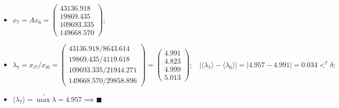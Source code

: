 \begin{itemize}
    \item
    $x_7 = Ax_6 =
    \begin{pmatrix}
        43136.918\\19869.435\\109693.335\\149668.570
    \end{pmatrix};$
    \item
    $\lambda_7 = x_{i7} / x_{i6} =
    \begin{pmatrix}
        43136.918/8643.614\\19869.435/4119.618\\109693.335/21944.271\\149668.570/29858.896
    \end{pmatrix} =
    \begin{pmatrix}
        4.991\\4.823\\4.999\\5.013
    \end{pmatrix};~~~~
    |\langle\lambda_7\rangle-\langle\lambda_6\rangle| = |4.957 - 4.991| = 0.034 <^7 \delta;$


    \item $\langle\lambda_7\rangle = \widetilde{\max{\lambda}} = 4.957 \implies \blacksquare $
\end{itemize}